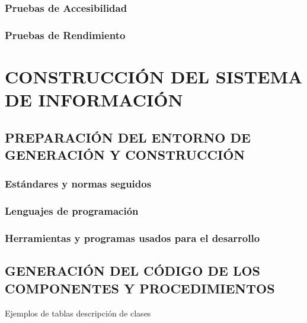 \documentclass[11pt]{report}
\begin{document}
\subsection{Pruebas de Accesibilidad} 

\subsection{Pruebas de Rendimiento} 


\newpage
\chapter{CONSTRUCCIÓN DEL SISTEMA DE INFORMACIÓN}


\newpage


\section{PREPARACIÓN DEL ENTORNO DE GENERACIÓN Y CONSTRUCCIÓN}

\subsection{Estándares y normas seguidos}


\subsection{Lenguajes de programación}


\subsection{Herramientas y programas usados para el desarrollo}


\newpage
\section{GENERACIÓN DEL CÓDIGO DE LOS COMPONENTES Y PROCEDIMIENTOS}

\textcolor[rgb]{0.65,0.16,0}{Ejemplos de tablas descripción de clases}
\end{document}
